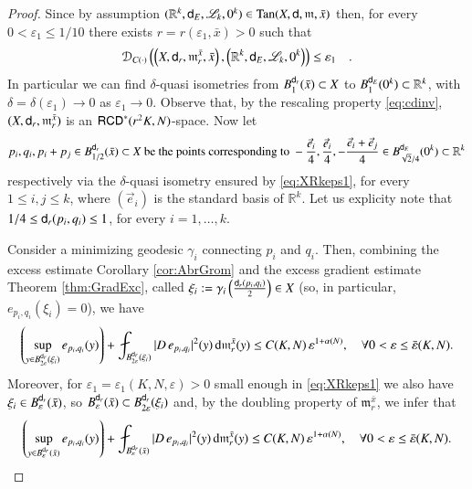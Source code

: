 \documentclass[11pt,reqno]{amsart}
\newcommand{\mm}{\mathfrak m}
\newcommand{\sfd}{{\sf d}}
\newcommand{\LL}{\mathscr{L}}
\renewcommand{\d}{{\rm{d}}}
\newcommand{\R}{\mathbb{R}}
\newcommand{\Tan}{{\rm Tan}}
\newcommand{\RCD}{{\sf RCD}}
\newcommand{\DC}{\mathcal D_{C(\cdot)}}
\newcommand{\vare}{\varepsilon}
\theoremstyle{definition}
\theoremstyle{remark}
\theoremstyle{remark}
\theoremstyle{remark}
\theoremstyle{remark}
\theoremstyle{remark}
\theoremstyle{remark}
\theoremstyle{remark}
\begin{document}
 \begin{proof} Since by assumption $(\R^k,\sfd_{E},\LL_k,0^k) \in \Tan(X,\sfd,\mm,\bar x)$ then, for every $0<\vare_1\leq 1/10$ there exists $r=r(\vare_1, \bar{x})>0$ such that
\begin{equation}\label{eq:XRkeps1}
\DC \left( \left(X, \sfd_r, \mm^{\bar{x}}_r, \bar{x} \right), \left( \R^k,\sfd_{E},\LL_k,0^k  \right) \right) \leq  \varepsilon_1\quad . 
\end{equation}
In particular we can find $\delta$-quasi isometries from $ B^{\sfd_r}_{1}(\bar{x})\subset X$ to $B^{\sfd_{E}}_{1}(0^{k})\subset \R^{k}$, with $\delta=\delta(\vare_{1})\to 0$ as $\vare_{1}\to 0$.
 Observe that, by the rescaling property \eqref{eq:cdinv}, $(X, \sfd_r, \mm^{\bar{x}}_r)$ is an $\RCD^*(r^2 K,N)$-space. Now let 
 \begin{equation}\label{eq:defpiqi}\nonumber
 p_i, q_i, p_i+p_j\in  B^{\sfd_r}_{1/2}(\bar{x})\subset X \text{ be the points corresponding  to } -\frac{\vec{e}_i}{4}, \frac{\vec{e}_i}{4}, -\frac{\vec{e}_i+\vec{e}_j}{4}  \in  B^{\sfd_{E}}_{\sqrt{2}/4}(0^k)\subset \R^k 
 \end{equation}
 respectively via the $\delta$-quasi isometry ensured by  \eqref{eq:XRkeps1}, for every $1\leq i,j \leq k$, where $(\vec{e}_i)$ is the standard basis of $\R^k$. Let us explicity note that $1/4 \leq \sfd_r(p_i,q_i) \leq 1$, for every $i=1, \ldots, k$.
 
 Consider a minimizing geodesic $\gamma_i$ connecting $p_i$ and $q_i$. Then, combining  the excess estimate Corollary \ref{cor:AbrGrom}  and the excess gradient estimate Theorem \ref{thm:GradExc}, called $\xi_i:=\gamma_i\left(\frac{\sfd_r(p_i,q_i)}{2}\right)\in X$ (so, in  particular, $e_{p_i,q_i}(\xi_i)=0$), we have 
 \begin{equation}\label{eq:epiqi}\nonumber
\left( \sup_{y \in B^{\sfd_r}_{2\vare}(\xi_i)} e_{p_i,q_i} (y) \right)+  \fint_{B^{\sfd_r}_{2\vare}(\xi_i)} |D \, e_{p_i,q_i}|^2 (y) \, \d \mm^{\bar x}_r(y) \leq C(K,N)\, \vare^{1+\alpha(N)}, \quad \forall 0<\vare\leq \bar{\vare}(K,N). 
 \end{equation} 
 Moreover, for $\vare_1=\vare_1(K,N,\vare)>0$ small enough in \eqref{eq:XRkeps1} we also have $\xi_i \in B^{\sfd_r}_{\vare}(\bar{x})$, so $B^{\sfd_r}_{\vare}(\bar{x})\subset B^{\sfd_r}_{2\vare}(\xi_i)$ and, by the doubling property of $\mm^{\bar x}_r$, we infer that
 \begin{equation}\label{eq:Depiqi}
\left( \sup_{y \in B^{\sfd_r}_{\vare}(\bar{x})} e_{p_i,q_i} (y) \right)+\fint_{B^{\sfd_r}_{\vare}(\bar{x})} |D \, e_{p_i,q_i}|^2 (y) \, \d \mm^{\bar x}_r(y) \leq C(K,N)\, \vare^{1+\alpha(N)}, \quad \forall 0<\vare\leq \bar{\vare}(K,N). 
 \end{equation} 
 

\end{proof}
\end{document}

